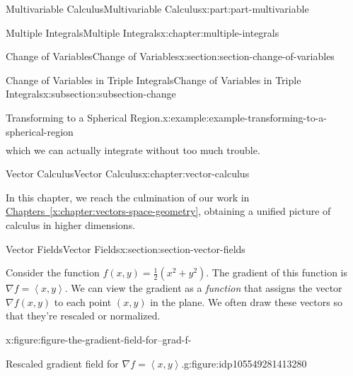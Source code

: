 \documentclass[twoside,10pt,]{book}
\newcommand{\xreffont}{\relax}
\numberwithin{equation}{part}
\newcommand{\grad}{\nabla}
\newcommand{\dotprod}[1]{\left\langle #1 \right\rangle}
\begin{document}
\begin{partptx}{Multivariable Calculus}{}{Multivariable Calculus}{}{}{x:part:part-multivariable}
\begin{chapterptx}{Multiple Integrals}{}{Multiple Integrals}{}{}{x:chapter:multiple-integrals}
\begin{sectionptx}{Change of Variables}{}{Change of Variables}{}{}{x:section:section-change-of-variables}
\begin{subsectionptx}{Change of Variables in Triple Integrals}{}{Change of Variables in Triple Integrals}{}{}{x:subsection:subsection-change}
\begin{example}{Transforming to a Spherical Region.}{x:example:example-transforming-to-a-spherical-region}
\begin{align*}
\end{align*}
which we can actually integrate without too much trouble.%
\end{example}
\end{subsectionptx}
\end{sectionptx}
\end{chapterptx}
%
\typeout{************************************************}
\typeout{************************************************}
%
\begin{chapterptx}{Vector Calculus}{}{Vector Calculus}{}{}{x:chapter:vector-calculus}
\begin{introduction}{}%
In this chapter, we reach the culmination of our work in \hyperref[x:chapter:vectors-space-geometry]{Chapters~{\xreffont\ref{x:chapter:vectors-space-geometry}}\textendash{}{\xreffont\ref{x:chapter:multiple-integrals}}}, obtaining a unified picture of calculus in higher dimensions.%
\end{introduction}%
%
%
\typeout{************************************************}
\typeout{************************************************}
%
\begin{sectionptx}{Vector Fields}{}{Vector Fields}{}{}{x:section:section-vector-fields}
\begin{introduction}{}%
Consider the function \(f(x,y) = \frac{1}{2}(x^{2} + y^{2})\). The gradient of this function is \(\grad f = \dotprod{x,y}\). We can view the gradient as a \emph{function} that assigns the vector \(\grad f(x,y)\) to each point \((x,y)\) in the plane. We often draw these vectors so that they're rescaled or normalized. \begin{figureptx}{}{x:figure:figure-the-gradient-field-for--grad-f-}{}%
\begin{sidebyside}{2}{0}{0}{0}%
\begin{sbspanel}{0.5}%
\begin{subfigureptx}{Rescaled gradient field for \(\grad f = \dotprod{x,y}\).}{g:figure:idp105549281413280}{}%

\end{subfigureptx}
\end{sbspanel}
\end{sidebyside}
\end{figureptx}
\end{introduction}
\end{sectionptx}
\end{chapterptx}
\end{partptx}
\end{document}

